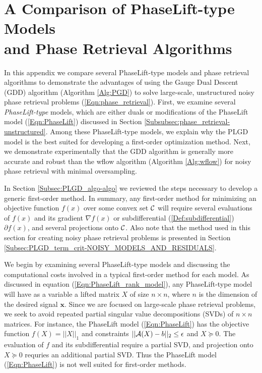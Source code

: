 \chapter{A Comparison of PhaseLift-type Models \\and Phase Retrieval Algorithms} 	\label{Sec:Appx-Comparison}





In this appendix we compare several PhaseLift-type models and phase retrieval algorithms to demonstrate the advantages of using the Gauge Dual Descent (GDD) algorithm (Algorithm \ref{Alg:PGD}) to solve large-scale, unstructured noisy phase retrieval problems (\ref{Eqn:phase_retrieval}). 
First, we examine several \textit{PhaseLift-type} models, which are either duals or modifications of the PhaseLift model (\ref{Eqn:PhaseLift}) discussed in Section \ref{Subsubsec:phase_retrieval-unstructured}.
Among these PhaseLift-type models, we explain why the PLGD model is the best suited for developing a first-order optimization method.
Next, we demonstrate experimentally that the GDD algorithm is generally more accurate and robust than the wflow algorithm (Algorithm \ref{Alg:wflow}) for noisy phase retrieval with minimal oversampling.

In Section \ref{Subsec:PLGD_algo-algo} we reviewed the steps necessary to develop a generic first-order method.
In summary, any first-order method for minimizing an objective function $f(x)$ over some convex set ${\mathcal C}$ will require several evaluations of $f(x)$ and its gradient $\nabla f(x)$ or subdifferential (\ref{Def:subdifferential}) $\partial f(x)$, and several projections onto ${\mathcal C}$.
Also note that the method used in this section for creating noisy phase retrieval problems is presented in Section \ref{Subsec:PLGD_term_crit-NOISY_MODELS_AND_RESIDUALS}.





We begin by examining several PhaseLift-type models and discussing the computational costs involved in a typical first-order method for each model.
As discussed in equation (\ref{Eqn:PhaseLift_rank_model}), any PhaseLift-type model will have as a variable a lifted matrix $X$ of size $n \times n$, where $n$ is the dimension of the desired signal $\mathbf{x}$.
Since we are focused on large-scale phase retrieval problems, we seek to avoid repeated partial singular value decompositions (SVDs) of $n \times n$ matrices.
For instance, the PhaseLift model (\ref{Eqn:PhaseLift}) has the objective function $f(X) = ||X||_1$ and constraints $||{\mathcal A}(X) - b||_2 \leq \epsilon$ and $X \succeq 0$.  
The evaluation of $f$ and its subdifferential require a partial SVD, and projection onto $X \succeq 0$ requries an additional partial SVD.
Thus the PhaseLift model (\ref{Eqn:PhaseLift}) is not well suited for first-order methods.

